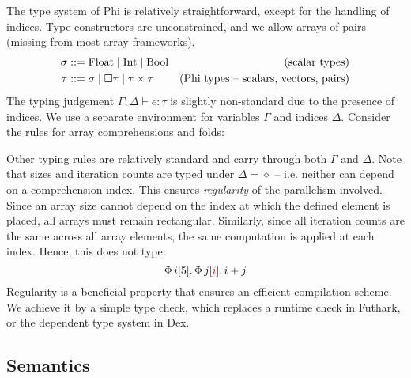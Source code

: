 The type system of Phi is relatively straightforward, except for the handling of indices. Type constructors are unconstrained, and we allow arrays of pairs (missing from most array frameworks).
\begin{align*}
\sigma &::= \phifloattype \mid \phiinttype \mid \phibooltype & \text{(scalar types)} \\
\tau &::= \sigma \mid \phivectype{\tau} \mid \phipairtype{\tau}{\tau} & \text{(Phi types -- scalars, vectors, pairs)}
\end{align*}
The typing judgement $\Gamma; \Delta \vdash e : \tau$ is slightly non-standard due to the presence of indices. We use a separate environment for variables $\Gamma$ and indices $\Delta$. Consider the rules for array comprehensions and folds:
\begin{center}
    \begin{prooftree}
    \end{prooftree} \quad
    \begin{prooftree}
    \end{prooftree}
\end{center}
Other typing rules are relatively standard and carry through both $\Gamma$ and $\Delta$. Note that sizes and iteration counts are typed under $\Delta = \diamond$ -- i.e. neither can depend on a comprehension index. This ensures \textit{regularity} of the parallelism involved. Since an array size cannot depend on the index at which the defined element is placed, all arrays must remain rectangular. Similarly, since all iteration counts are the same across all array elements, the same computation is applied at each index. Hence, this does not type:
$$ \phivec{i}{5}{\phivec{j}{\textcolor{red}{i}}{i + j}} $$
Regularity is a beneficial property that ensures an efficient compilation scheme. We achieve it by a simple type check, which replaces a runtime check in Futhark, or the dependent type system in Dex. 

\subsection{Semantics}

